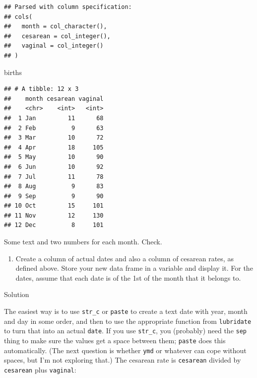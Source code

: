 \documentclass[]{tufte-book}
\newenvironment{Shaded}{}{}
\newcommand{\NormalTok}[1]{#1}
\providecommand{\tightlist}{%
  \setlength{\itemsep}{0pt}\setlength{\parskip}{0pt}}
\theoremstyle{definition}
\theoremstyle{definition}
\theoremstyle{definition}
\theoremstyle{remark}
\begin{document}
\begin{verbatim}
## Parsed with column specification:
## cols(
##   month = col_character(),
##   cesarean = col_integer(),
##   vaginal = col_integer()
## )
\end{verbatim}

\begin{Shaded}
\begin{Highlighting}[]
\NormalTok{births}
\end{Highlighting}
\end{Shaded}

\begin{verbatim}
## # A tibble: 12 x 3
##    month cesarean vaginal
##    <chr>    <int>   <int>
##  1 Jan         11      68
##  2 Feb          9      63
##  3 Mar         10      72
##  4 Apr         18     105
##  5 May         10      90
##  6 Jun         10      92
##  7 Jul         11      78
##  8 Aug          9      83
##  9 Sep          9      90
## 10 Oct         15     101
## 11 Nov         12     130
## 12 Dec          8     101
\end{verbatim}

Some text and two numbers for each month. Check.

\begin{enumerate}
\def\labelenumi{(\alph{enumi})}
\setcounter{enumi}{1}
\tightlist
\item
  Create a column of actual dates and also a column of cesarean rates,
  as defined above. Store your new data frame in a variable and display
  it. For the dates, assume that each date is of the 1st of the month
  that it belongs to.
\end{enumerate}

Solution

The easiest way is to use \texttt{str\_c} or \texttt{paste} to create a
text date with year, month and day in some order, and then to use the
appropriate function from \texttt{lubridate} to turn that into an actual
\texttt{date}. If you use \texttt{str\_c}, you (probably) need the
\texttt{sep} thing to make sure the values get a space between them;
\texttt{paste} does this automatically. (The next question is whether
\texttt{ymd} or whatever can cope without spaces, but I'm not exploring
that.) The cesarean rate is \texttt{cesarean} divided by
\texttt{cesarean} plus \texttt{vaginal}:
\end{document}
